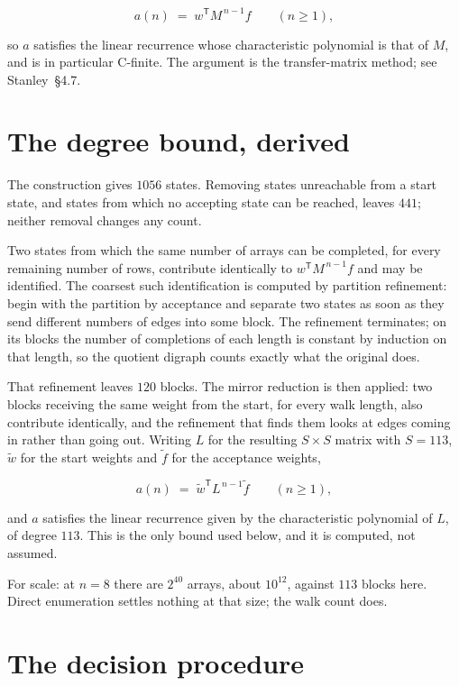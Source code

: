 \documentclass[11pt]{article}
\theoremstyle{definition}
\begin{document}
\[a(n) \;=\; w^{\mathsf T} M^{\,n-1} f \qquad (n \ge 1),\]

so $a$ satisfies the linear recurrence whose characteristic polynomial is that of $M$, and is in particular C-finite. The argument is the transfer-matrix method; see Stanley~\S4.7.

\section{The degree bound, derived}

The construction gives $1056$ states. Removing states unreachable from a start state, and states from which no accepting state can be reached, leaves $441$; neither removal changes any count.

Two states from which the same number of arrays can be completed, for every remaining number of rows, contribute identically to $w^{\mathsf T}M^{\,n-1}f$ and may be identified. The coarsest such identification is computed by partition refinement: begin with the partition by acceptance and separate two states as soon as they send different numbers of edges into some block. The refinement terminates; on its blocks the number of completions of each length is constant by induction on that length, so the quotient digraph counts exactly what the original does.

That refinement leaves $120$ blocks. The mirror reduction is then applied: two blocks receiving the same weight from the start, for every walk length, also contribute identically, and the refinement that finds them looks at edges coming in rather than going out. Writing $L$ for the resulting $S \times S$ matrix with $S = 113$, $\tilde w$ for the start weights and $\tilde f$ for the acceptance weights,

\[a(n) \;=\; \tilde w^{\mathsf T} L^{\,n-1} \tilde f \qquad (n \ge 1),\]

and $a$ satisfies the linear recurrence given by the characteristic polynomial of $L$, of degree $113$. This is the only bound used below, and it is computed, not assumed.

For scale: at $n = 8$ there are $2^{40}$ arrays, about $10^{12}$, against $113$ blocks here. Direct enumeration settles nothing at that size; the walk count does.

\section{The decision procedure}
\end{document}

